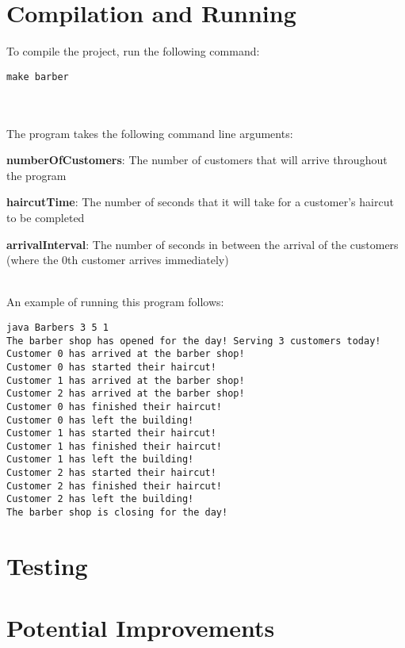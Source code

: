 \documentclass{article}%
\begin{document}
\section*{Compilation and Running}

To compile the project, run the following command:

\lstset{language=Bash}
\begin{lstlisting}[frame=single]
make barber
\end{lstlisting}\\
\\
The program takes the following command line arguments:
\begin{itemize}
    \begin{item}
        \textbf{numberOfCustomers}: The number of customers that will arrive throughout the program
    \end{item}

    \begin{item}
        \textbf{haircutTime}: The number of seconds that it will take for a customer's haircut to be completed
    \end{item}

    \begin{item}
        \textbf{arrivalInterval}: The number of seconds in between the arrival of the customers (where the 0th customer arrives immediately)
    \end{item}
\end{itemize}
\\
An example of running this program follows:
\begin{verbatim}
java Barbers 3 5 1
The barber shop has opened for the day! Serving 3 customers today!
Customer 0 has arrived at the barber shop!
Customer 0 has started their haircut!
Customer 1 has arrived at the barber shop!
Customer 2 has arrived at the barber shop!
Customer 0 has finished their haircut!
Customer 0 has left the building!
Customer 1 has started their haircut!
Customer 1 has finished their haircut!
Customer 1 has left the building!
Customer 2 has started their haircut!
Customer 2 has finished their haircut!
Customer 2 has left the building!
The barber shop is closing for the day!
\end{verbatim}

\section*{Testing}

\section*{Potential Improvements}
\end{document}
